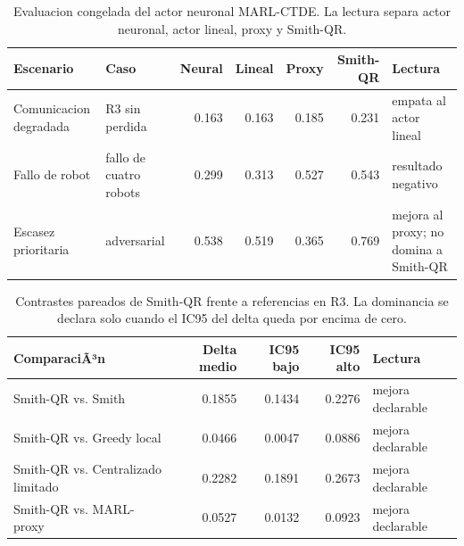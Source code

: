 \begin{table}[H]
\centering
\caption{Evaluacion congelada del actor neuronal MARL-CTDE. La lectura separa actor neuronal, actor lineal, proxy y Smith-QR.}
\label{tab:validation-suite-marl-neural}
\small
\begin{tabularx}{\textwidth}{@{}>{\raggedright\arraybackslash}p{}>{\raggedright\arraybackslash}p{}rrrr>{\raggedright\arraybackslash}X@{}}
\toprule
Escenario & Caso & Neural & Lineal & Proxy & Smith-QR & Lectura \\
\midrule
Comunicacion degradada & R3 sin perdida & 0.163 & 0.163 & 0.185 & 0.231 & empata al actor lineal \\
Fallo de robot & fallo de cuatro robots & 0.299 & 0.313 & 0.527 & 0.543 & resultado negativo \\
Escasez prioritaria & adversarial & 0.538 & 0.519 & 0.365 & 0.769 & mejora al proxy; no domina a Smith-QR \\
\bottomrule
\end{tabularx}
\end{table}

\begin{table}[H]
\centering
\caption{Contrastes pareados de Smith-QR frente a referencias en R3. La dominancia se declara solo cuando el IC95 del delta queda por encima de cero.}
\label{tab:validation-suite-deltas}
\small
\begin{tabularx}{\textwidth}{@{}>{\raggedright\arraybackslash}Xrrr>{\raggedright\arraybackslash}X@{}}
\toprule
ComparaciÃ³n & Delta medio & IC95 bajo & IC95 alto & Lectura \\
\midrule
Smith-QR vs. Smith & 0.1855 & 0.1434 & 0.2276 & mejora declarable \\
Smith-QR vs. Greedy local & 0.0466 & 0.0047 & 0.0886 & mejora declarable \\
Smith-QR vs. Centralizado limitado & 0.2282 & 0.1891 & 0.2673 & mejora declarable \\
Smith-QR vs. MARL-proxy & 0.0527 & 0.0132 & 0.0923 & mejora declarable \\
\bottomrule
\end{tabularx}
\end{table}
